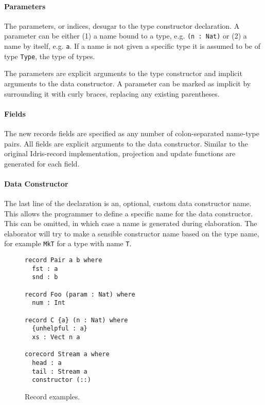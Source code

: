 \paragraph{Parameters}
The parameters, or indices, desugar to the type constructor declaration. A parameter can be either (1) a
name bound to a type, e.g. \texttt{(n : Nat)} or (2) a name by itself,
e.g. \texttt{a}. If a name is not given a specific type it is assumed to be of type
\texttt{Type}, the type of types. 

The parameters are explicit arguments to the type
constructor and implicit arguments to the data constructor. A parameter can be
marked as implicit by surrounding it with curly braces, replacing any existing
parentheses.

\paragraph{Fields}
The new records fields are specified as any number of colon-separated name-type pairs. All
fields are explicit arguments to the data constructor. Similar to the original Idris-record implementation, projection and
update functions are generated for each field.
\paragraph{Data Constructor}
The last line of the declaration is an, optional, custom data constructor
name. This allows the programmer to define a specific name for the data
constructor. This can be omitted, in which case a name is generated during
elaboration. The elaborator will try to make a sensible constructor name based
on the type name, for example \texttt{MkT} for a type with name \texttt{T}.

\begin{figure}[h]
\begin{lstlisting}
record Pair a b where
  fst : a
  snd : b

record Foo (param : Nat) where
  num : Int

record C {a} (n : Nat) where
  {unhelpful : a}
  xs : Vect n a

corecord Stream a where
  head : a
  tail : Stream a
  constructor (::) 

\end{lstlisting}
  \caption{Record examples.}
  \label{fig:new_record_examples}
\end{figure}


